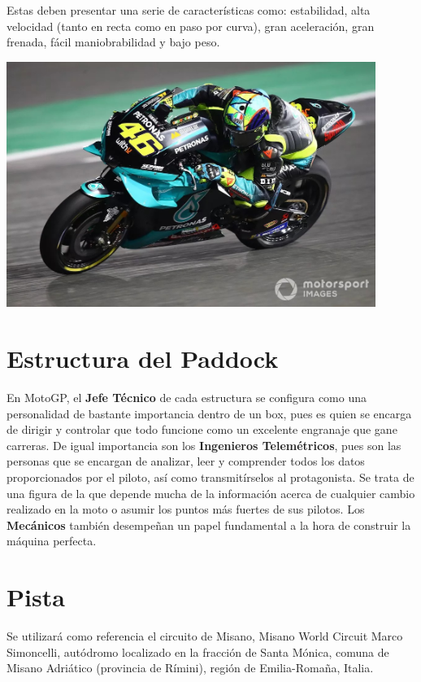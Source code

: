 \documentclass[12pt, letterpaper,spanish]{article}
\theoremstyle{definition}
\theoremstyle{remark}
\begin{document}
	Estas deben presentar una serie de características como: estabilidad, alta velocidad (tanto en recta como en paso por curva), gran aceleración, gran frenada, fácil maniobrabilidad y bajo peso.
	
	\begin{center}
		\includegraphics[width = 12cm]{imagen1} 
	\end{center}	
	
\section{Estructura del Paddock}
	 En MotoGP, el \textbf{Jefe Técnico} de cada estructura se configura como una personalidad de bastante importancia dentro de un box, pues es quien se encarga de dirigir y controlar que todo funcione como un excelente engranaje que gane carreras. De igual importancia son los \textbf{Ingenieros Telemétricos}, pues son las personas que se encargan de analizar, leer y comprender todos los datos proporcionados por el piloto, así como transmitírselos al protagonista. Se trata de una figura de la que depende mucha de la información acerca de cualquier cambio realizado en la moto o asumir los puntos más fuertes de sus pilotos. Los \textbf{Mecánicos} también desempeñan un papel fundamental a la hora de construir la máquina perfecta.

\section{Pista}
	Se utilizará como referencia el circuito de Misano, Misano World Circuit Marco Simoncelli, autódromo localizado en la fracción de Santa Mónica, comuna de Misano Adriático (provincia de Rímini), región de Emilia-Romaña, Italia. 
	
\end{document}
